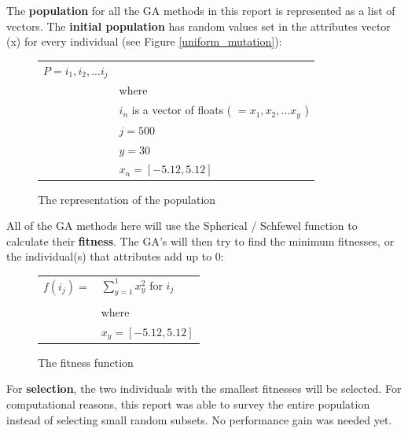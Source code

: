 \documentclass[12pt]{article}
\begin{document}
The \textbf{population} for all the GA methods in this report is represented as a list of vectors. The \textbf{initial population} has random values set in the attributes vector (x) for every individual (see Figure \ref{uniform_mutation}):
\begin{figure}[!h]
        \begin{center}
		\begin{tabular}{r l}
	                $ P = i_1, i_2, ... i_j $	& \\
								& where \\
								& $ i_n $ is a vector of floats ( $ = x_1, x_2, ... x_y $ ) \\
								& $ j = 500 $ \\
								& $ y = 30 $ \\
								& $ x_n = [-5.12, 5.12] $
		\end{tabular} 
               \caption{The representation of the population}
                \label{population}
        \end{center}
\end{figure}

All of the GA methods here will use the Spherical / Schfewel function to calculate their \textbf{fitness}. The GA's will then try to find the minimum fitnesses, or the individual(s) that attributes add up to 0:
\begin{figure}[!h]
        \begin{center}
		\begin{tabular}{r l}
			$ f(i_j) = $			&	$ \sum_{y=1}^{1}x_y^2	$ for $ i_j $ \\
								& \\
								&	where \\
								&	$ x_y = [-5.12, 5.12 ] $ \\
		\end{tabular} 
               \caption{The fitness function}
                \label{fitness}
        \end{center}
\end{figure}

For \textbf{selection}, the two individuals with the smallest fitnesses will be selected. For computational reasons, this report was able to survey the entire population instead of selecting small random subsets. No performance gain was needed yet.
\end{document}

